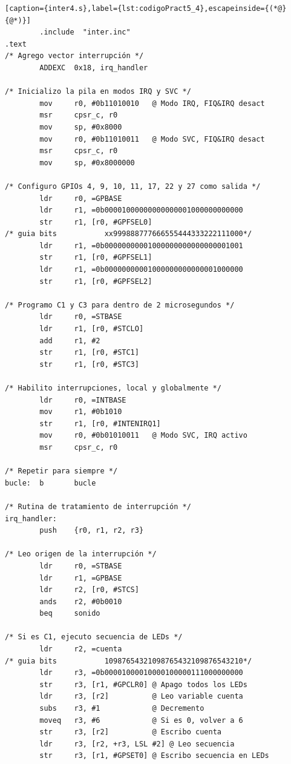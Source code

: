 \begin{lstlisting}[caption={inter4.s},label={lst:codigoPract5_4},escapeinside={(*@}{@*)}]
        .include  "inter.inc"
.text
/* Agrego vector interrupción */
        ADDEXC  0x18, irq_handler

/* Inicializo la pila en modos IRQ y SVC */
        mov     r0, #0b11010010   @ Modo IRQ, FIQ&IRQ desact
        msr     cpsr_c, r0
        mov     sp, #0x8000
        mov     r0, #0b11010011   @ Modo SVC, FIQ&IRQ desact
        msr     cpsr_c, r0
        mov     sp, #0x8000000

/* Configuro GPIOs 4, 9, 10, 11, 17, 22 y 27 como salida */
        ldr     r0, =GPBASE
        ldr     r1, =0b00001000000000000001000000000000
        str     r1, [r0, #GPFSEL0]
/* guia bits           xx999888777666555444333222111000*/
        ldr     r1, =0b00000000001000000000000000001001
        str     r1, [r0, #GPFSEL1]
        ldr     r1, =0b00000000001000000000000001000000
        str     r1, [r0, #GPFSEL2]

/* Programo C1 y C3 para dentro de 2 microsegundos */
        ldr     r0, =STBASE
        ldr     r1, [r0, #STCLO]
        add     r1, #2
        str     r1, [r0, #STC1]
        str     r1, [r0, #STC3]

/* Habilito interrupciones, local y globalmente */
        ldr     r0, =INTBASE
        mov     r1, #0b1010
        str     r1, [r0, #INTENIRQ1]
        mov     r0, #0b01010011   @ Modo SVC, IRQ activo
        msr     cpsr_c, r0

/* Repetir para siempre */
bucle:  b       bucle

/* Rutina de tratamiento de interrupción */
irq_handler:
        push    {r0, r1, r2, r3}

/* Leo origen de la interrupción */
        ldr     r0, =STBASE
        ldr     r1, =GPBASE
        ldr     r2, [r0, #STCS]
        ands    r2, #0b0010
        beq     sonido

/* Si es C1, ejecuto secuencia de LEDs */
        ldr     r2, =cuenta
/* guia bits           10987654321098765432109876543210*/
        ldr     r3, =0b00001000010000100000111000000000
        str     r3, [r1, #GPCLR0] @ Apago todos los LEDs
        ldr     r3, [r2]          @ Leo variable cuenta
        subs    r3, #1            @ Decremento
        moveq   r3, #6            @ Si es 0, volver a 6
        str     r3, [r2]          @ Escribo cuenta
        ldr     r3, [r2, +r3, LSL #2] @ Leo secuencia
        str     r3, [r1, #GPSET0] @ Escribo secuencia en LEDs


\end{lstlisting}
